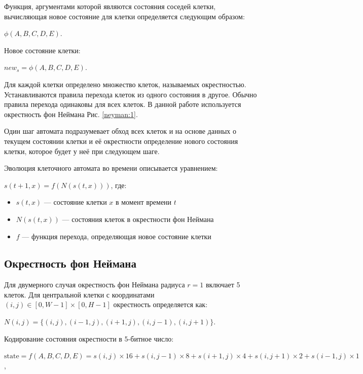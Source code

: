 \documentclass[11pt,a4paper,final]{article}
\begin{document}
	 \par Функция, аргументами которой являются состояния соседей клетки, вычисляющая новое состояние для клетки определяется следующим образом: 
	 \begin{center}
	 	$\phi(A, B, C, D, E)$.
	\end{center}
	
	 Новое состояние клетки:
	 \begin{center}
		$new_s = \phi(A, B, C, D, E)$.
	\end{center}
	
	Для каждой клетки определено множество клеток, называемых окрестностью. Устанавливаются правила перехода клеток из одного состояния в другое. Обычно правила перехода одинаковы для всех клеток. В данной работе используется окрестность фон Неймана Рис. \ref{neyman:1}.
	
	\par Один шаг автомата подразумевает обход всех клеток и на основе данных о текущем состоянии клетки и её окрестности определение нового состояния клетки, которое будет у неё при следующем шаге.
	
	\par Эволюция клеточного автомата во времени описывается уравнением:
	 \begin{center}
		$s(t+1, x) = f(N(s(t, x)))$, где:
	 \end{center}
	 
	\begin{itemize}
		\item $s(t, x)$ — состояние клетки $x$ в момент времени $t$
		\item $N(s(t, x))$ — состояния клеток в окрестности фон Неймана
		\item $f$ — функция перехода, определяющая новое состояние клетки
	\end{itemize}
	
	
	\subsection{Окрестность фон Неймана}
	
	Для двумерного случая окрестность фон Неймана радиуса $r=1$ включает 5 клеток. Для центральной клетки с координатами $(i, j) \in [0, W-1] \times [0, H-1]$ окрестность определяется как:
	 \begin{center}
		$N(i,j) = \{(i,j), (i-1,j), (i+1,j), (i,j-1), (i,j+1)\}$.
	\end{center}
	
	Кодирование состояния окрестности в 5-битное число:
	\begin{center}
		$\text{state} = f(A, B, C, D, E) = s(i,j) \times 16 + s(i,j-1) \times 8 + s(i+1,j) \times 4 + s(i,j+1) \times 2 + s(i-1,j) \times 1$,
	\end{center}
	
\end{document}
